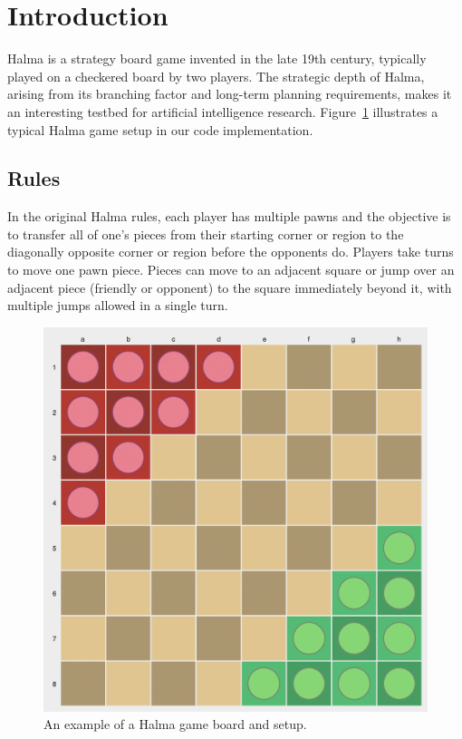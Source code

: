 \section{Introduction}
Halma is a strategy board game invented in the late 19th century, typically played on a checkered board by two players. The strategic depth of Halma, arising from its branching factor and long-term planning requirements, makes it an interesting testbed for artificial intelligence research. Figure~\ref{fig:halma} illustrates a typical Halma game setup in our code implementation.


\subsection{Rules}
In the original Halma rules, each player has multiple pawns and the objective is to transfer all of one's pieces from their starting corner or region to the diagonally opposite corner or region before the opponents do. Players take turns to move one pawn piece. Pieces can move to an adjacent square or jump over an adjacent piece (friendly or opponent) to the square immediately beyond it, with multiple jumps allowed in a single turn.
\begin{figure}[h]
    \centering
    \includegraphics[width=1\columnwidth]{figures/halma.png}
    \caption{An example of a Halma game board and setup.}
    \label{fig:halma}
\end{figure}
